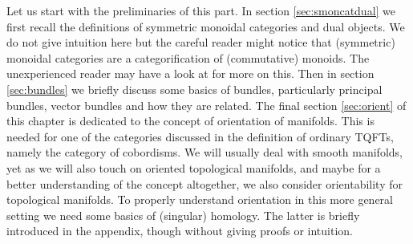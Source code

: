 Let us start with the preliminaries of this part. In section \ref{sec:smoncatdual} we first recall the definitions of symmetric monoidal categories and dual objects. We do not give intuition here but the careful reader might notice that (symmetric) monoidal categories are a categorification of (commutative) monoids. The unexperienced reader may have a look at \cite{00000001} for more on this. Then in section \ref{sec:bundles} we briefly discuss some basics of bundles, particularly principal bundles, vector bundles and how they are related. The final section \ref{sec:orient} of this chapter is dedicated to the concept of orientation of manifolds. This is needed for one of the categories discussed in the definition of ordinary TQFTs, namely the category of cobordisms. We will usually deal with smooth manifolds, yet as we will also touch on oriented topological manifolds, and maybe for a better understanding of the concept altogether, we also consider orientability for topological manifolds. To properly understand orientation in this more general setting we need some basics of (singular) homology. The latter is briefly introduced in the appendix, though without giving proofs or intuition.

